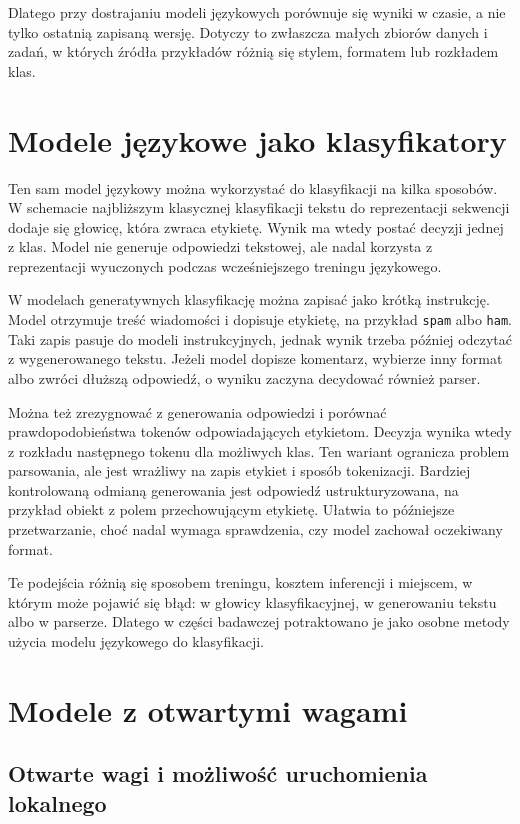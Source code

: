 Dlatego przy dostrajaniu modeli językowych porównuje się wyniki w czasie, a nie
tylko ostatnią zapisaną wersję. Dotyczy to zwłaszcza małych zbiorów danych i
zadań, w których źródła przykładów różnią się stylem, formatem lub rozkładem
klas.

\section{Modele językowe jako klasyfikatory}

Ten sam model językowy można wykorzystać do klasyfikacji na kilka sposobów. W
schemacie najbliższym klasycznej klasyfikacji tekstu do reprezentacji sekwencji
dodaje się głowicę, która zwraca etykietę. Wynik ma wtedy postać decyzji jednej
z klas. Model nie generuje odpowiedzi tekstowej, ale nadal korzysta z
reprezentacji wyuczonych podczas wcześniejszego treningu językowego.

W modelach generatywnych klasyfikację można zapisać jako krótką instrukcję.
Model otrzymuje treść wiadomości i dopisuje etykietę, na przykład \texttt{spam}
albo \texttt{ham}. Taki zapis pasuje do modeli instrukcyjnych, jednak
wynik trzeba później odczytać z wygenerowanego tekstu. Jeżeli model dopisze
komentarz, wybierze inny format albo zwróci dłuższą odpowiedź, o wyniku zaczyna
decydować również parser.

Można też zrezygnować z generowania odpowiedzi i porównać prawdopodobieństwa
tokenów odpowiadających etykietom. Decyzja wynika wtedy z rozkładu następnego
tokenu dla możliwych klas. Ten wariant ogranicza problem parsowania, ale jest
wrażliwy na zapis etykiet i sposób tokenizacji. Bardziej kontrolowaną odmianą
generowania jest odpowiedź ustrukturyzowana, na przykład obiekt z polem
przechowującym etykietę. Ułatwia to późniejsze przetwarzanie, choć nadal wymaga
sprawdzenia, czy model zachował oczekiwany format.

Te podejścia różnią się sposobem treningu, kosztem inferencji i miejscem, w
którym może pojawić się błąd: w głowicy klasyfikacyjnej, w generowaniu tekstu
albo w parserze. Dlatego w części badawczej potraktowano je jako osobne metody
użycia modelu językowego do klasyfikacji.

\section{Modele z otwartymi wagami}

\subsection{Otwarte wagi i możliwość uruchomienia lokalnego}

